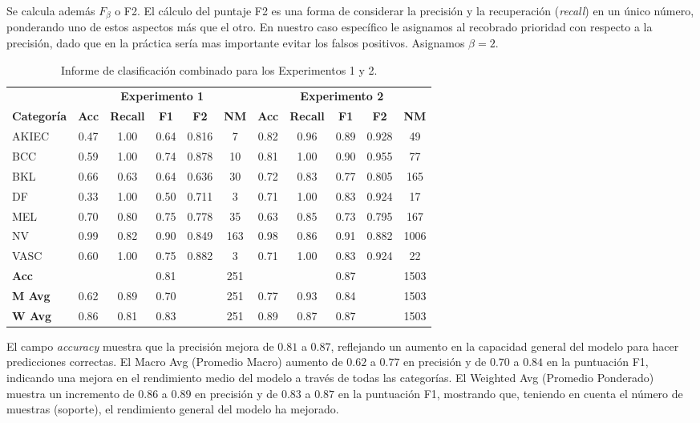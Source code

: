 Se calcula además $F_{\beta}$ o F2. El cálculo del puntaje F2 es una forma de considerar la precisión y la recuperación (\textit{recall}) en un único número, ponderando uno de estos aspectos más que el otro. En nuestro caso específico le asignamos al recobrado prioridad con respecto a la precisión, dado que en la práctica sería mas importante evitar los falsos positivos. Asignamos $\beta = 2$.

\begin{table}[H]
    \small
    \centering
    \caption{Informe de clasificación combinado para los Experimentos 1 y 2.}
    \label{tab:classification_report_combined}
    \begin{tabular}{lcccccccccc}
    \hline
    & \multicolumn{5}{c}{\textbf{Experimento 1}} & \multicolumn{5}{c}{\textbf{Experimento 2}} \\
    \cline{2-10}
    \textbf{Categoría} & \textbf{Acc} & \textbf{Recall} & \textbf{F1} & \textbf{F2} & \textbf{NM} & \textbf{Acc} & \textbf{Recall} & \textbf{F1} & \textbf{F2} & \textbf{NM} \\
    \hline
    AKIEC & 0.47 & 1.00 & 0.64 & 0.816 & 7   & 0.82 & 0.96 & 0.89 & 0.928  & 49 \\
    BCC   & 0.59 & 1.00 & 0.74 & 0.878 & 10  & 0.81 & 1.00 & 0.90 &  0.955 & 77 \\
    BKL   & 0.66 & 0.63 & 0.64 & 0.636 & 30  & 0.72 & 0.83 & 0.77 & 0.805  & 165 \\
    DF    & 0.33 & 1.00 & 0.50 & 0.711 & 3   & 0.71 & 1.00 & 0.83 & 0.924  & 17 \\
    MEL   & 0.70 & 0.80 & 0.75 & 0.778 & 35  & 0.63 & 0.85 & 0.73 & 0.795  & 167 \\
    NV    & 0.99 & 0.82 & 0.90 & 0.849 & 163 & 0.98 & 0.86 & 0.91 & 0.882  & 1006 \\
    VASC  & 0.60 & 1.00 & 0.75 & 0.882 & 3   & 0.71 & 1.00 & 0.83 & 0.924  & 22 \\
    \hline
    \textbf{Acc} & & & 0.81 & & 251 & & & 0.87 & & 1503 \\
    \textbf{M Avg} & 0.62 & 0.89 & 0.70 & & 251 & 0.77 & 0.93 & 0.84 & & 1503 \\
    \textbf{W Avg} & 0.86 & 0.81 & 0.83 & & 251 & 0.89 & 0.87 & 0.87 & & 1503 \\
    \hline
    \end{tabular}
\end{table}


El campo \textit{accuracy} muestra que la precisión mejora de $0.81$ a $0.87$, reflejando un aumento en la capacidad general del modelo para hacer predicciones correctas. El Macro Avg (Promedio Macro) aumento de $0.62$ a $0.77$ en precisión y de $0.70$ a $0.84$ en la puntuación F1, indicando una mejora en el rendimiento medio del modelo a través de todas las categorías. El Weighted Avg (Promedio Ponderado) muestra un incremento de $0.86$ a $0.89$ en precisión y de $0.83$ a $0.87$ en la puntuación F1, mostrando que, teniendo en cuenta el número de muestras (soporte), el rendimiento general del modelo ha mejorado.

